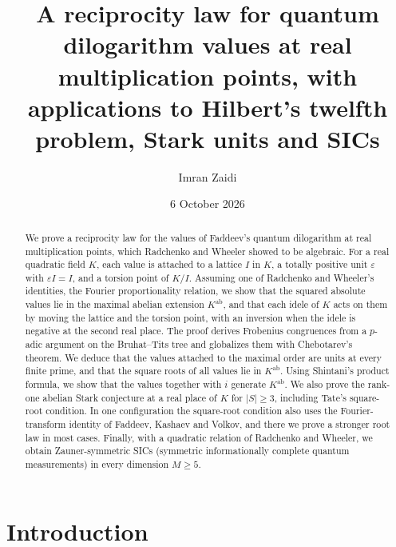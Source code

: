 \documentclass[11pt]{amsart}
\numberwithin{equation}{section}
\theoremstyle{plain}
\theoremstyle{definition}
\theoremstyle{remark}
\begin{document}
\title[Reciprocity for quantum dilogarithm values]{A reciprocity law for quantum dilogarithm values at real multiplication points, with applications to Hilbert's twelfth problem, Stark units and SICs}
\author{Imran Zaidi}
\address{Montr\'eal, Qu\'ebec, Canada}
\date{6 October 2026}

\begin{abstract}
We prove a reciprocity law for the values of Faddeev's quantum dilogarithm at real multiplication points, which Radchenko and Wheeler showed to be algebraic. For a real quadratic field $K$, each value is attached to a lattice $I$ in $K$, a totally positive unit $\varepsilon$ with $\varepsilon I=I$, and a torsion point of $K/I$. Assuming one of Radchenko and Wheeler's identities, the Fourier proportionality relation, we show that the squared absolute values lie in the maximal abelian extension $K^{\mathrm{ab}}$, and that each idele of $K$ acts on them by moving the lattice and the torsion point, with an inversion when the idele is negative at the second real place. The proof derives Frobenius congruences from a $p$-adic argument on the Bruhat--Tits tree and globalizes them with Chebotarev's theorem. We deduce that the values attached to the maximal order are units at every finite prime, and that the square roots of all values lie in $K^{\mathrm{ab}}$. Using Shintani's product formula, we show that the values together with $i$ generate $K^{\mathrm{ab}}$. We also prove the rank-one abelian Stark conjecture at a real place of $K$ for $|S|\ge3$, including Tate's square-root condition. In one configuration the square-root condition also uses the Fourier-transform identity of Faddeev, Kashaev and Volkov, and there we prove a stronger root law in most cases. Finally, with a quadratic relation of Radchenko and Wheeler, we obtain Zauner-symmetric SICs (symmetric informationally complete quantum measurements) in every dimension $M\ge5$.
\end{abstract}


\maketitle
\setcounter{tocdepth}{1}
\tableofcontents

\section{Introduction}\label{sec:intro}
\end{document}
